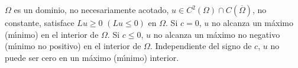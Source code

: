 



\begin{theorem}
$\Omega$ es un dominio, no necesariamente acotado, $u\in
C^{2}\left( \Omega\right)  \cap C\left(  \overline{\Omega}\right)
$, no constante, satisface $Lu\geq0$ $\left(  Lu\leq0\right)  $ en
$\Omega$. Si $c=0$, $u$ no alcanza un m\'{a}ximo (m\'{\i}nimo) en
el interior de $\Omega$. Si $c\leq0$, $u$ no alcanza un m\'{a}ximo
no negativo (m\'{\i}nimo no positivo) en el interior de $\Omega$.
Independiente del signo de $c$, $u$ no puede ser cero en un
m\'{a}ximo (m\'{\i}nimo) interior.
\end{theorem}
